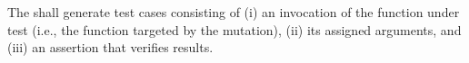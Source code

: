 \RQ{} The \FAQAS shall generate test cases consisting of (i) an invocation of the function under test (i.e., the function targeted by the mutation), (ii) its assigned arguments, and (iii) an assertion that verifies results.

%
%
%
%
%
%

